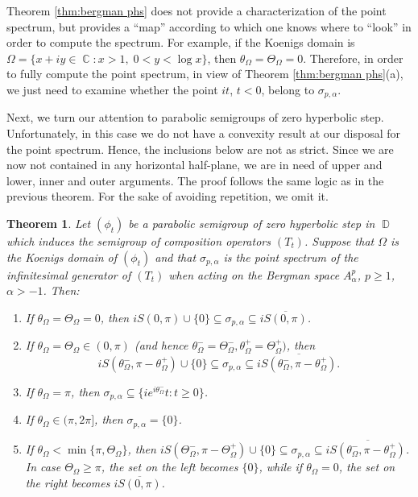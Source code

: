 \documentclass[11pt]{amsart}
\numberwithin{equation}{section}
\newtheorem{theorem}{Theorem}[section]
\theoremstyle{definition}
\DeclareMathOperator{\C}{\mathbb{C}}
\DeclareMathOperator{\D}{\mathbb{D}}
\begin{document}
	Theorem \ref{thm:bergman phs} does not provide a characterization of the point spectrum, but provides a ``map'' according to which one knows where to ``look'' in order to compute the spectrum. For example, if the Koenigs domain is $\Omega=\{x+iy\in\C:x>1,\; 0<y<\log x\}$, then $\theta_\Omega=\Theta_\Omega=0$. Therefore, in order to fully compute the point spectrum, in view of Theorem \ref{thm:bergman phs}(a), we just need to examine whether the point $it$, $t<0$, belong to $\sigma_{p,\alpha}$.
	
	Next, we turn our attention to parabolic semigroups of zero hyperbolic step. Unfortunately, in this case we do not have a convexity result at our disposal for the point spectrum. Hence, the inclusions below are not as strict. Since we are now not contained in any horizontal half-plane, we are in need of upper and lower, inner and outer arguments. The proof follows the same logic as in the previous theorem. For the sake of avoiding repetition, we omit it.
	
	
	\begin{theorem}\label{thm:bergman 0hs}
		Let $(\phi_t)$ be a parabolic semigroup of zero hyperbolic step in $\D$ which induces the semigroup of composition operators $(T_t)$. Suppose that $\Omega$ is the Koenigs domain of $(\phi_t)$ and that $\sigma_{p,\alpha}$ is the point spectrum of the infinitesimal generator of $(T_t)$ when acting on the Bergman space $A_\alpha^p$, $p\ge1$, $\alpha>-1$. Then:
		\begin{enumerate}
			\item[\textup{(a)}] If $\theta_\Omega=\Theta_\Omega=0$, then $iS(0,\pi)\cup\{0\}\subseteq\sigma_{p,\alpha}\subseteq i\overline{S(0,\pi)}$.
			\item[\textup{(b)}] If $\theta_\Omega=\Theta_\Omega\in(0,\pi)$ (and hence $\theta_\Omega^-=\Theta_\Omega^-, \theta_\Omega^+=\Theta_\Omega^+)$, then
			$$iS(\theta_\Omega^-,\pi-\theta_\Omega^+)\cup\{0\}\subseteq \sigma_{p,\alpha} \subseteq i\overline{S(\theta_\Omega^-,\pi-\theta_\Omega^+)}.$$
			\item[\textup{(c)}] If $\theta_\Omega=\pi$, then $\sigma_{p,\alpha}\subseteq \{ie^{i\theta_\Omega^-}t:t\ge0\}$.
			\item[\textup{(d)}] If $\theta_\Omega\in(\pi,2\pi]$, then $\sigma_{p,\alpha}=\{0\}$.
			\item[\textup{(e)}] If $\theta_\Omega<\min\{\pi,\Theta_\Omega\}$, then $iS(\Theta_\Omega^-,\pi-\Theta_\Omega^+)\cup\{0\}\subseteq\sigma_{p,\alpha}\subseteq i\overline{S(\theta_\Omega^-,\pi-\theta_\Omega^+)}$. In case $\Theta_\Omega\ge\pi$, the set on the left becomes $\{0\}$, while if $\theta_\Omega=0$, the set on the right becomes $i\overline{S(0,\pi)}$.
		\end{enumerate} 
	\end{theorem}
	
\end{document}
